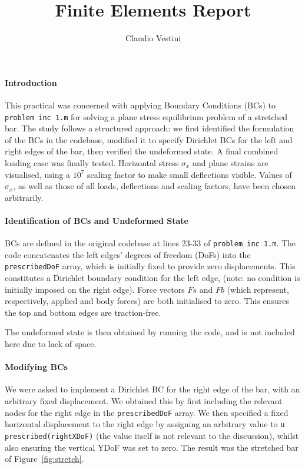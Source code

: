 \documentclass[hidelinks]{article}
\title{\vspace{-1cm} Finite Elements Report}
\author{\vspace{-2cm} Claudio Vestini}
\date{}
\begin{document}
\maketitle
%
\paragraph{Introduction}
This practical was concerned with applying Boundary Conditions (BCs) to \texttt{problem inc 1.m} for solving a plane stress equilibrium problem of a stretched bar.
The study follows a structured approach: we first identified the formulation of the BCs in the codebase, modified it to specify Dirichlet BCs for the left and right edges of the bar, then verified the undeformed state. A final combined loading case was finally tested.
Horizontal stress $\sigma_x$ and plane strains are visualised, using a $10^7$ scaling factor to make small deflections visible.
Values of $\sigma_x$, as well as those of all loads, deflections and scaling factors, have been chosen arbitrarily.

\paragraph{Identification of BCs and Undeformed State}
BCs are defined in the original codebase at lines 23-33 of \texttt{problem inc 1.m}. The code concatenates the left edges' degrees of freedom (DoFs) into the \texttt{prescribedDoF} array, which is initially fixed to provide zero displacements. This constitutes a Dirichlet boundary condition for the left edge, (note: no condition is initially imposed on the right edge). Force vectors $Fs$ and $Fb$ (which represent, respectively, applied and body forces) are both initialised to zero. This ensures the top and bottom edges are traction-free.

The undeformed state is then obtained by running the code, and is not included here due to lack of space.
\paragraph{Modifying BCs}
We were asked to implement a Dirichlet BC for the right edge of the bar, with an arbitrary fixed displacement. We obtained this by first including the relevant nodes for the right edge in the \texttt{prescribedDoF} array. We then specified a fixed horizontal displacement to the right edge by assigning an arbitrary value to \texttt{u prescribed(rightXDoF)} (the value itself is not relevant to the discussion), whilst also ensuring the vertical YDoF was set to zero. The result was the stretched bar of Figure~\ref{fig:stretch}.
\end{document}
